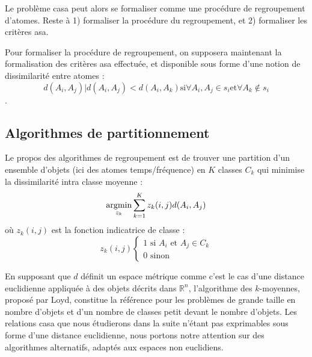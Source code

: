 Le problème casa peut alors se formaliser comme une procédure de regroupement d'atomes. Reste à 1) formaliser la procédure du regroupement, et 2) formaliser les critères asa.

Pour formaliser la procédure de regroupement, on supposera maintenant la formalisation des critères asa effectuée, et disponible sous forme d'une notion de dissimilarité entre atomes : $$d(A_i, A_j) | d(A_i, A_j) < d(A_i, A_k) \text{si} \forall A_i, A_j \in s_i \text{et} \forall A_k \notin s_i$$.

\subsection{Algorithmes de partitionnement}


Le propos des algorithmes de regroupement est de trouver une partition d'un ensemble d'objets (ici des atomes temps/fréquence) en $K$ classes $C_k$ qui minimise la dissimilarité intra classe moyenne :
\begin{equation}
  \operatorname*{argmin}_{z_k} \sum_{k=1}^{K} z_k(i, j) d(A_i, A_j)
\end{equation}
où $z_k(i, j)$ est la fonction indicatrice de classe :
\begin{equation}
  z_k(i, j)
  \begin{cases}
    1 \text{ si } A_i \text{ et } A_j \in C_k \\
    0 \text{ sinon}
  \end{cases}
\end{equation}

En supposant que $d$ définit un espace métrique comme c'est le cas d'une distance euclidienne appliquée à des objets décrits dans $\mathbb{R}^n$, l'algorithme des $k$-moyennes, proposé par Loyd\cite{lloyd1982least}, constitue la référence pour les problèmes de grande taille en nombre d'objets et d'un nombre de classes petit devant le nombre d'objets. Les relations casa que nous étudierons dans la suite n'étant pas exprimables sous forme d'une distance euclidienne, nous portons notre attention sur des algorithmes alternatifs, adaptés aux espaces non euclidiens.

